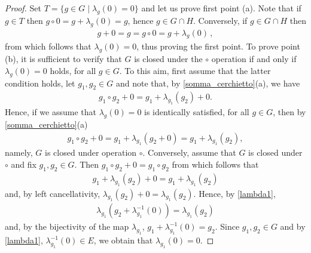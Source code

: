 \documentclass[11pt]{amsart}
\theoremstyle{definition}
\begin{document}
\begin{proof}
Set $T = \{ g \in G \mid \lambda_g(0) = 0 \}$ and let us prove first point {\rm (a)}. Note that if $g \in T$ then $g \circ 0 = g +\lambda_g(0) = g$, hence $g \in G \cap H$.
Conversely, if $g \in G \cap H$ then
\begin{align*}
    g + 0 = g = g \circ 0 = g + \lambda_g(0) \,,
\end{align*}
from which follows that $\lambda_g(0) = 0$, thus proving the first point.
To prove point {\rm (b)}, it is sufficient to verify that $G$ is closed under the $\circ$ operation if and only if $\lambda_g(0) = 0$ holds, for all $g \in G$.
To this aim, first assume that the latter condition holds, let $g_1,g_2\in G$ and note that, by \cref{somma_cerchietto}(a), we have
\begin{align*}
  g_1\circ g_2 + 0
  = g_1 + \lambda_{g_1}(g_2) + 0.
\end{align*}
Hence, if we assume that $\lambda_g(0) = 0$ is identically satisfied, for all $g \in G$, then by \cref{somma_cerchietto}(a)
\begin{align*}
  g_1\circ g_2 + 0
  = g_1 + \lambda_{g_1}(g_2 + 0)
  = g_1 + \lambda_{g_1}(g_2),
\end{align*}
namely, $G$ is closed under operation $\circ$.
Conversely, assume that $G$ is closed under $\circ$ and fix $g_1,g_2 \in G$.
Then $g_1\circ g_2 + 0 = g_1\circ g_2$ from which follows that
\begin{align*}
  g_1 + \lambda_{g_1}(g_2) + 0 = g_1 + \lambda_{g_1}(g_2)
\end{align*}
and, by left cancellativity, $\lambda_{g_1}(g_2) + 0 = \lambda_{g_1}(g_2)$. Hence, by \cref{lambda1},
\begin{align*}
  \lambda_{g_1}(g_2 + \lambda^{-1}_{g_1}(0)) = \lambda_{g_1}(g_2)
\end{align*}
and, by the bijectivity of the map $\lambda_{g_1}$, $g_1+\lambda^{-1}_{g_1}(0) = g_2$. Since $g_1,g_2\in G$ and by \cref{lambda1}, $\lambda^{-1}_{g_1}(0)\in E$, we obtain that $\lambda_{g_1}(0) = 0$.
\end{proof}

\medskip
\end{document}
